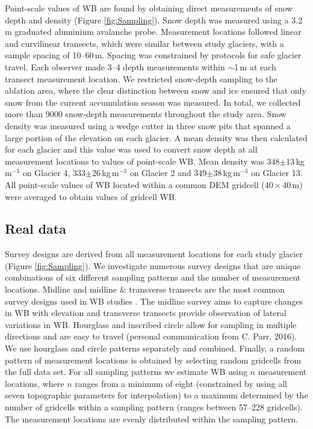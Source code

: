 \documentclass{article}
\begin{document}
Point-scale values of WB are found by obtaining direct measurements of snow depth and density (Figure \ref{fig:Sampling}). Snow depth was measured using a 3.2\,m graduated aluminium avalanche probe. Measurement locations followed linear and curvilinear transects, which were similar between study glaciers, with a sample spacing of 10--60\,m.  Spacing was constrained by protocols for safe glacier travel. Each observer made 3--4 depth measurements within $\sim$1\,m at each transect measurement location. We restricted snow-depth sampling to the ablation area, where the clear distinction between snow and ice ensured that only snow from the current accumulation season was measured. In total, we collected more than 9000 snow-depth measurements throughout the study area. Snow density was measured using a wedge cutter in three snow pits that spanned a large portion of the elevation on each glacier. A mean density was then calculated for each glacier and this value was used to convert snow depth at all measurement locations to values of point-scale WB. Mean density was 348$\pm$13\,kg\,m$^{-3}$ on Glacier 4, 333$\pm$26\,kg\,m$^{-3}$ on Glacier 2 and 349$\pm$38\,kg\,m$^{-3}$ on Glacier 13. All point-scale values of WB located within a common DEM gridcell ($40\times40$\,m) were averaged to obtain values of gridcell WB. 

\subsection{Real data}

Survey designs are derived from all measurement locations for each study glacier (Figure \ref{fig:Sampling}). We investigate numerous survey designs that are unique combinations of six different sampling patterns and the number of measurement locations. Midline and midline \& transverse transects are the most common survey designs used in WB studies  \parencite[e.g.][]{Kaser2002, Machguth2006}. The midline survey aims to capture changes in WB with elevation and transverse transects provide observation of lateral variations in WB. Hourglass and inscribed circle allow for sampling in multiple directions and are easy to travel (personal communication from C. Parr, 2016). We use hourglass and circle patterns separately and combined. Finally, a random pattern of measurement locations is obtained by selecting random gridcells from the full data set. For all sampling patterns we estimate WB using $n$ measurement locations, where $n$ ranges from a minimum of eight (constrained by using all seven topographic parameters for interpolation) to a maximum determined by the number of gridcells within a sampling pattern (ranges between 57--228 gridcells). The measurement locations are evenly distributed within the sampling pattern. 
\end{document}
